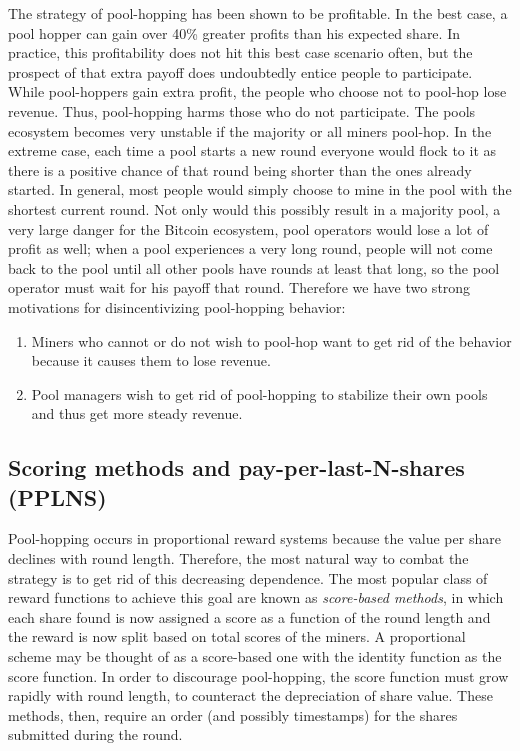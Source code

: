 \documentclass{article}
\theoremstyle{plain}
\theoremstyle{definition}
\begin{document}
The strategy of pool-hopping has been shown to be profitable. In the best case, a pool hopper can gain over 40\% greater profits than his expected share\cite{Rosefeld2011}. In practice, this profitability does not hit this best case scenario often, but the prospect of that extra payoff does undoubtedly entice people to participate. While pool-hoppers gain extra profit, the people who choose not to pool-hop lose revenue. Thus, pool-hopping harms those who do not participate. The pools ecosystem becomes very unstable if the majority or all miners pool-hop. In the extreme case, each time a pool starts a new round everyone would flock to it as there is a positive chance of that round being shorter than the ones already started. In general, most people would simply choose to mine in the pool with the shortest current round. Not only would this possibly result in a majority pool, a very large danger for the Bitcoin ecosystem, pool operators would lose a lot of profit as well; when a pool experiences a very long round, people will not come back to the pool until all other pools have rounds at least that long, so the pool operator must wait for his payoff that round. Therefore we have two strong motivations for disincentivizing pool-hopping behavior:
\begin{enumerate}
\item
Miners who cannot or do not wish to pool-hop want to get rid of the behavior because it causes them to lose revenue.
\item
Pool managers wish to get rid of pool-hopping to stabilize their own pools and thus get more steady revenue.
\end{enumerate}

\subsection{Scoring methods and pay-per-last-N-shares (PPLNS)}

Pool-hopping occurs in proportional reward systems because the value per share declines with round length. Therefore, the most natural way to combat the strategy is to get rid of this decreasing dependence. The most popular class of reward functions to achieve this goal are known as \emph{score-based methods}, in which each share found is now assigned a score as a function of the round length and the reward is now split based on total scores of the miners. A proportional scheme may be thought of as a score-based one with the identity function as the score function. In order to discourage pool-hopping, the score function must grow rapidly with round length, to counteract the depreciation of share value. These methods, then, require an order (and possibly timestamps) for the shares submitted during the round.
\end{document}
